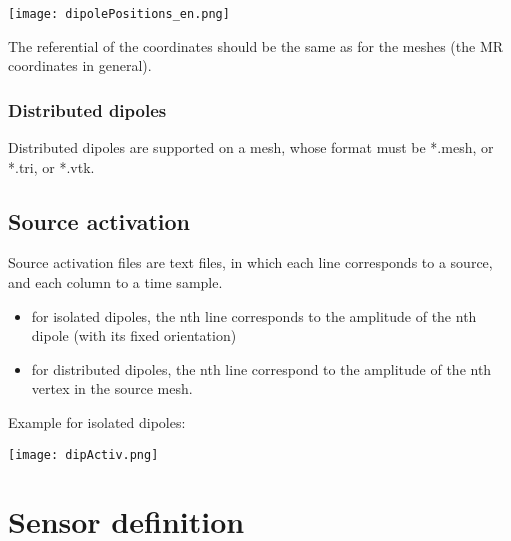 \centerline{\texttt{[image: dipolePositions\_en.png]}}

\begin{note}
	The referential of the coordinates should be the same as for the meshes (the MR coordinates in general).
\end{note}
\subsubsection{Distributed dipoles}
Distributed dipoles are supported on a mesh, whose format must be *.mesh, or *.tri, or *.vtk.
\subsection{Source activation}
\label{sec:activ}

\noindent

Source activation files are text files, in which each line corresponds to a source, and each column to a time sample.
\begin{itemize}
    \item for isolated dipoles, the nth line corresponds to the amplitude of the nth dipole (with its fixed orientation)
    \item for distributed dipoles, the nth line correspond to the amplitude of the nth vertex in the source mesh.
\end{itemize}

\medskip

\noindent
Example for isolated dipoles:

\centerline{\texttt{[image: dipActiv.png]}}


\section{Sensor definition}
\label{sec:sensors}

